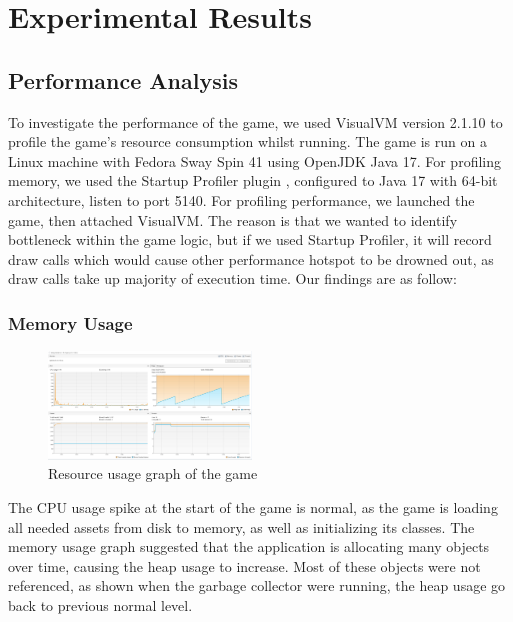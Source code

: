 \documentclass[conference]{IEEEtran}
\begin{document}
\section{Experimental Results}
\label{sec:experimental_results}

\subsection{Performance Analysis}

To investigate the performance of the game, we used VisualVM version 2.1.10 \cite{src:visual-vm} to profile the game's resource consumption whilst running.
The game is run on a Linux machine with Fedora Sway Spin 41 using OpenJDK Java 17.
For profiling memory, we used the Startup Profiler plugin \cite{src:startup-profiler}, configured to Java 17 with 64-bit architecture, listen to port 5140.
For profiling performance, we launched the game, then attached VisualVM.
The reason is that we wanted to identify bottleneck within the game logic, but if we used Startup Profiler, it will record draw calls which would cause other performance hotspot to be drowned out, as draw calls take up majority of execution time.
Our findings are as follow:

\subsubsection{Memory Usage}

\begin{figure}[htbp]
    \centerline{\includegraphics[width=0.48\textwidth]{assets/resource-usage.png}}
    \caption{Resource usage graph of the game}\label{fig:resource-usage}
\end{figure}

The CPU usage spike at the start of the game is normal, as the game is loading all needed assets from disk to memory, as well as initializing its classes.
The memory usage graph suggested that the application is allocating many objects over time, causing the heap usage to increase.
Most of these objects were not referenced, as shown when the garbage collector were running, the heap usage go back to previous normal level.
\end{document}
